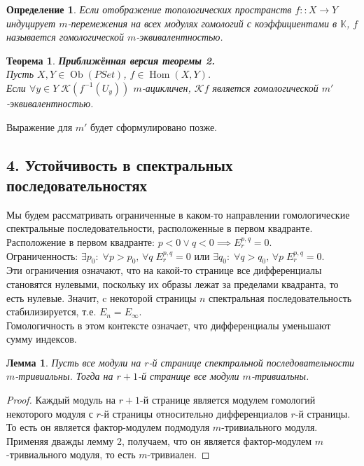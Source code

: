 \documentclass[a4paper,12pt]{report}
\newtheorem{theorem}{Теорема}
\newtheorem{lemma}{Лемма}
\newtheorem{definition}{Определение}
\begin{document}
\begin{definition}
  Если отображение топологических пространств $f :: X \to Y$ индуцирует $m$-перемежения на всех модулях гомологий с коэффициентами в $\mathbb{K}$, $f$ называется гомологической $m$-эквивалентностью.
\end{definition}
\begin{theorem}
  \textbf{Приближённая версия теоремы 2.}\\
  Пусть $X, Y \in \operatorname{Ob}(PSet)$, $f \in \operatorname{Hom}(X,Y)$.\\
  Если $\forall y \in Y\;\mathcal{K}(f^{-1}(U_y))$ $m$-ацикличен, $\mathcal{K}f$ является гомологической $m'$-эквивалентностью.\\
\end{theorem}
Выражение для $m'$ будет сформулировано позже.
\subsection*{4. Устойчивость в спектральных последовательностях}
Мы будем рассматривать ограниченные в каком-то направлении гомологические спектральные последовательности, расположенные в первом квадранте.\\
Расположение в первом квадранте: $p < 0 \lor q < 0 \implies E_r^{p,q} = 0$.\\
Ограниченность: $\exists p_0:\;\forall p>p_0,\,\forall q\; E_r^{p,q} = 0$ или $\exists q_0:\;\forall q>q_0,\,\forall p\; E_r^{p,q} = 0$.\\
Эти ограничения означают, что на какой-то странице все дифференциалы становятся нулевыми, поскольку их образы лежат за пределами квадранта, то есть нулевые. Значит, c некоторой страницы $n$ спектральная последовательность стабилизируется, т.е. $E_n = E_{\infty}$.\\
Гомологичность в этом контексте означает, что дифференциалы уменьшают сумму индексов.\\

\begin{lemma}
  Пусть все модули на $r$-й странице спектральной последовательности $m$-тривиальны. Тогда на $r+1$-й странице все модули $m$-тривиальны.
\end{lemma}
\begin{proof}
  Каждый модуль на $r+1$-й странице является модулем гомологий некоторого модуля с $r$-й страницы относительно дифференциалов $r$-й страницы. То есть он является фактор-модулем подмодуля $m$-тривиального модуля. Применяя дважды лемму 2, получаем, что он является фактор-модулем $m$-тривиального модуля, то есть $m$-тривиален.
\end{proof}
\end{document}
